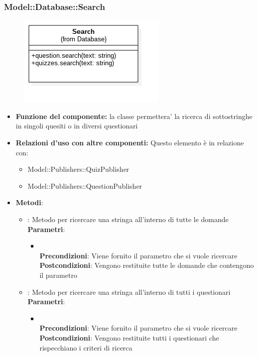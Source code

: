 \subsubsection{Model::Database::Search}
\begin{figure}[h!]
\begin{center}
	\includegraphics[scale=0.4]{../images/Model/Database/Search.png}
\end{center}
\end{figure}
\begin{itemize}
\item\textbf{Funzione del componente:} la classe permettera' la ricerca di sottostringhe in singoli quesiti o in diversi questionari 
\item\textbf{Relazioni d'uso con altre componenti:} 
Questo elemento è in relazione con:
\begin{itemize}
\item Model::Publishers::QuizPublisher\\
\item Model::Publishers::QuestionPublisher\\
\end{itemize}  
\item\textbf{Metodi}:
\begin{itemize}
	\item{} : Metodo per ricercare una stringa all'interno di tutte le domande\\
	\textbf{Parametri}:
	\begin{itemize}
		\item{}\\
		\textbf{Precondizioni}: Viene fornito il parametro che si vuole ricercare\\
		\textbf{Postcondizioni}: Vengono restituite tutte le domande che contengono il parametro\\
	\end{itemize}
	\item{} :  Metodo per ricercare una stringa all'interno di tutti i questionari\\
	\textbf{Parametri}:
	\begin{itemize}
		\item{}\\
		\textbf{Precondizioni}: Viene fornito il parametro che si vuole ricercare\\
		\textbf{Postcondizioni}: Vengono restituite tutti i questionari che rispecchiano i criteri di ricerca\\
	\end{itemize}
\end{itemize}
\end{itemize}
\newpage


